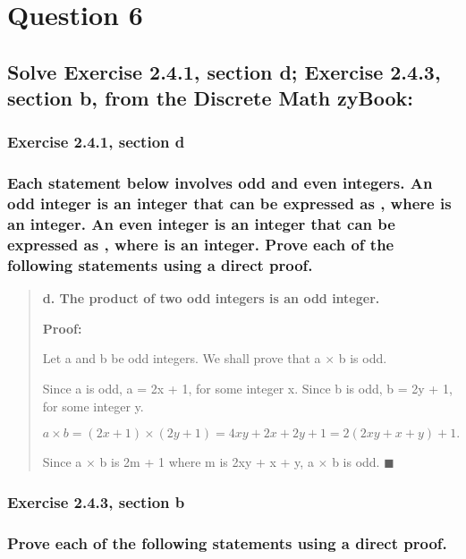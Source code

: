 \documentclass[11pt, oneside]{article}
\begin{document}
\pagebreak

\section*{Question 6}

\subsection*{Solve Exercise 2.4.1, section d; Exercise 2.4.3, section b, from the Discrete Math zyBook:}

\subsubsection*{Exercise 2.4.1, section d}

\subsubsection*{Each statement below involves odd and even integers. An odd integer is an integer that can be expressed as , where  is an integer. An even integer is an integer that can be expressed as , where  is an integer. Prove each of the following statements using a direct proof.}

\begin{quote}
    \textbf{d. The product of two odd integers is an odd integer.}
    
    \textbf{Proof:}
    
    Let a and b be odd integers. We shall prove that a $\times$ b is odd.
    
    Since a is odd, a = 2x + 1, for some integer x. Since b is odd, b = 2y + 1, for some integer y.
    
    \[a \times b = (2x + 1) \times (2y + 1) = 4xy + 2x + 2y + 1 = 2(2xy + x + y) + 1.\]
    
    Since a $\times$ b is 2m + 1 where m is 2xy + x + y, a $\times$ b is odd. $\blacksquare$
\end{quote}

\subsubsection*{Exercise 2.4.3, section b}

\subsubsection*{Prove each of the following statements using a direct proof.}
\end{document}
